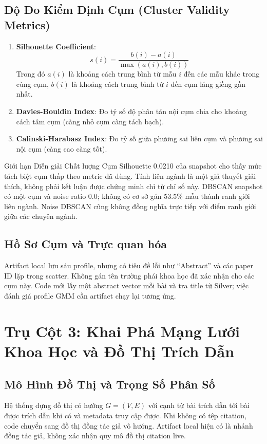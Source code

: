\subsection{Độ Đo Kiểm Định Cụm (Cluster Validity Metrics)}
\begin{enumerate}[label=\alph*)]
  \item \textbf{Silhouette Coefficient}:
    \begin{equation}
      s(i) = \frac{b(i) - a(i)}{\max(a(i), b(i))}
    \end{equation}
    Trong đó $a(i)$ là khoảng cách trung bình từ mẫu $i$ đến các mẫu khác trong cùng cụm, $b(i)$ là khoảng cách trung bình từ $i$ đến cụm láng giềng gần nhất.
  \item \textbf{Davies-Bouldin Index}: Đo tỷ số độ phân tán nội cụm chia cho khoảng cách tâm cụm (càng nhỏ cụm càng tách bạch).
  \item \textbf{Calinski-Harabasz Index}: Đo tỷ số giữa phương sai liên cụm và phương sai nội cụm (càng cao càng tốt).
\end{enumerate}

\begin{calloutbox}{Giới hạn Diễn giải Chất lượng Cụm}
Silhouette 0.0210 của snapshot cho thấy mức tách biệt cụm thấp theo metric đã dùng. Tính liên ngành là một giả thuyết giải thích, không phải kết luận được chứng minh chỉ từ chỉ số này. DBSCAN snapshot có một cụm và noise ratio 0.0; không có cơ sở gán 53.5\% mẫu thành ranh giới liên ngành. Noise DBSCAN cũng không đồng nghĩa trực tiếp với điểm ranh giới giữa các chuyên ngành.
\end{calloutbox}

\subsection{Hồ Sơ Cụm và Trực quan hóa}
Artifact local lưu sáu profile, nhưng có tiêu đề lỗi như ``Abstract'' và các paper ID lặp trong scatter. Không gán tên trường phái khoa học đã xác nhận cho các cụm này. Code mới lấy một abstract vector mỗi bài và tra title từ Silver; việc đánh giá profile GMM cần artifact chạy lại tương ứng.

\section{Trụ Cột 3: Khai Phá Mạng Lưới Khoa Học và Đồ Thị Trích Dẫn}

\subsection{Mô Hình Đồ Thị và Trọng Số Phân Số}
Hệ thống dựng đồ thị có hướng $G=(V,E)$ với cạnh từ bài trích dẫn tới bài được trích dẫn khi có  và metadata truy cập được. Khi không có tệp citation, code chuyển sang đồ thị đồng tác giả vô hướng. Artifact local hiện có là nhánh đồng tác giả, không xác nhận quy mô đồ thị citation live.


